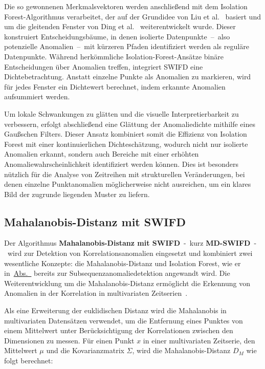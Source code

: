 Die so gewonnenen Merkmalsvektoren werden anschließend mit dem Isolation Forest-Algorithmus verarbeitet, der auf der Grundidee von Liu et al.~\cite{Liu2012}
basiert und um die gleitenden Fenster von Ding et al.~\cite{Ding2013} weiterentwickelt wurde. Dieser konstruiert Entscheidungsbäume, in denen isolierte
Datenpunkte~–~also potenzielle Anomalien~–~mit kürzeren Pfaden identifiziert werden als
reguläre Datenpunkte. Während herkömmliche Isolation-Forest-Ansätze binäre Entscheidungen über Anomalien treffen, integriert SWIFD eine Dichtebetrachtung.
Anstatt einzelne Punkte als Anomalien zu markieren, wird für jedes Fenster ein Dichtewert berechnet, indem erkannte Anomalien aufsummiert werden.

Um lokale Schwankungen zu glätten und die visuelle Interpretierbarkeit zu verbessern, erfolgt abschließend eine Glättung der Anomaliedichte mithilfe eines
Gaußschen Filters. Dieser Ansatz kombiniert somit die Effizienz von Isolation Forest mit einer kontinuierlichen Dichteschätzung, wodurch nicht nur isolierte
Anomalien erkannt, sondern auch Bereiche mit einer erhöhten Anomaliewahrscheinlichkeit identifiziert werden können. Dies ist besonders nützlich für die
Analyse von Zeitreihen mit strukturellen Veränderungen, bei denen einzelne Punktanomalien möglicherweise nicht ausreichen, um ein klares Bild der zugrunde
liegenden Muster zu liefern.

\subsection{Mahalanobis-Distanz mit SWIFD}
Der Algorithmus \textbf{Mahalanobis-Distanz mit SWIFD}~-~kurz \textbf{MD-SWIFD}~-~wird zur Detektion von Korrelationsanomalien eingesetzt und kombiniert zwei
wesentliche Konzepte: die Mahala\-nobis-Distanz und Isolation Forest, wie er in~\hyperref[subsec:swifd]{Abs.~} bereits
zur Subsequenzanomaliedetektion angewandt wird. Die Weiterentwicklung um die Mahalanobis-Distanz ermöglicht die Erkennung von Anomalien in der Korrelation
in multivariaten Zeitserien~\cite{McLachlan1999}.

Als eine Erweiterung der euklidischen Distanz wird die Mahalanobis in multivariaten Datensätzen verwendet, um die Entfernung eines Punktes von einem Mittelwert unter
Berücksichtigung der Korrelationen zwischen den Dimensionen zu messen. Für einen Punkt $x$ in einer multivariaten Zeitserie, den Mittelwert $\mu$ und die
Kovarianzmatrix $\Sigma$, wird die Mahalanobis-Distanz $D_M$ wie folgt berechnet:

